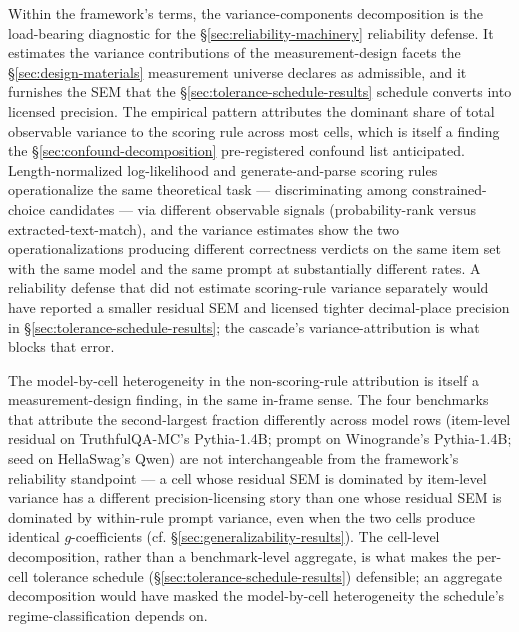 \documentclass[11pt]{article}
\begin{document}
Within the framework's terms, the variance-components decomposition is the load-bearing diagnostic for the §\ref{sec:reliability-machinery} reliability defense. It estimates the variance contributions of the measurement-design facets the §\ref{sec:design-materials} measurement universe declares as admissible, and it furnishes the SEM that the §\ref{sec:tolerance-schedule-results} schedule converts into licensed precision. The empirical pattern attributes the dominant share of total observable variance to the scoring rule across most cells, which is itself a finding the §\ref{sec:confound-decomposition} pre-registered confound list anticipated. Length-normalized log-likelihood and generate-and-parse scoring rules operationalize the same theoretical task --- discriminating among constrained-choice candidates --- via different observable signals (probability-rank versus extracted-text-match), and the variance estimates show the two operationalizations producing different correctness verdicts on the same item set with the same model and the same prompt at substantially different rates. A reliability defense that did not estimate scoring-rule variance separately would have reported a smaller residual SEM and licensed tighter decimal-place precision in §\ref{sec:tolerance-schedule-results}; the cascade's variance-attribution is what blocks that error.

The model-by-cell heterogeneity in the non-scoring-rule attribution is itself a measurement-design finding, in the same in-frame sense. The four benchmarks that attribute the second-largest fraction differently across model rows (item-level residual on TruthfulQA-MC's Pythia-1.4B; prompt on Winogrande's Pythia-1.4B; seed on HellaSwag's Qwen) are not interchangeable from the framework's reliability standpoint --- a cell whose residual SEM is dominated by item-level variance has a different precision-licensing story than one whose residual SEM is dominated by within-rule prompt variance, even when the two cells produce identical $g$-coefficients (cf. §\ref{sec:generalizability-results}). The cell-level decomposition, rather than a benchmark-level aggregate, is what makes the per-cell tolerance schedule (§\ref{sec:tolerance-schedule-results}) defensible; an aggregate decomposition would have masked the model-by-cell heterogeneity the schedule's regime-classification depends on.
\end{document}
